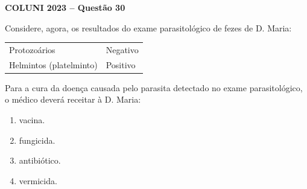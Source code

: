 \textbf{COLUNI 2023 -- Questão 30}\par\medskip Considere, agora, os resultados do exame parasitológico de fezes de D. Maria:

\begin{center}
\begin{tabular}{|p{8cm}|l|}
\hline
Protozoários\dotfill & Negativo\\
Helmintos (platelminto)\dotfill & Positivo\\
\hline
\end{tabular}
\end{center}

Para a cura da doença causada pelo parasita detectado no exame parasitológico, o médico deverá receitar à D. Maria:
\begin{enumerate}
\item vacina.
\item fungicida.
\item antibiótico.
\item vermicida.
\end{enumerate}

